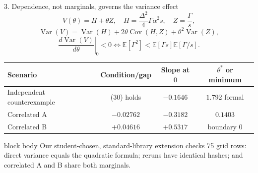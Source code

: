 \documentclass[aspectratio=169,11pt]{beamer}
\newcommand{\keybox}[1]{%
  \begin{beamercolorbox}[rounded=true,sep=0.8ex]{block body}
    #1
  \end{beamercolorbox}%
}
\begin{document}
\begin{frame}{3. Dependence, not marginals, governs the variance effect}
  \vspace{-0.25cm}
  \[
    V(\theta)=H+\theta Z,\quad
    H=\frac{\Delta^2}{4}\Gamma\alpha^2s,\quad Z=\frac{\Gamma}{s},
  \]
  \vspace{-0.25cm}
  \[
    \operatorname{Var}(V)=\operatorname{Var}(H)
    +2\theta\operatorname{Cov}(H,Z)+\theta^2\operatorname{Var}(Z),
  \]
  \vspace{-0.20cm}
  \[
    \left.\frac{d\operatorname{Var}(V)}{d\theta}\right|_0<0
    \iff
    \mathbb E[\Gamma^2]<\mathbb E[\Gamma s]\mathbb E[\Gamma/s].
  \]

  \vspace{-0.10cm}
  \begin{center}
  \small
  \begin{tabular}{lccc}
    \toprule
    Scenario & Condition/gap & Slope at \(0\) & \(\theta^*\) or minimum \\
    \midrule
    Independent counterexample & (30) holds & \(-0.1646\) & \(1.792\) formal \\
    Correlated A & \(-0.02762\) & \(-0.3182\) & \(0.1403\) \\
    Correlated B & \(+0.04616\) & \(+0.5317\) & boundary \(0\) \\
    \bottomrule
  \end{tabular}
  \end{center}

  \keybox{\small Our student-chosen, standard-library extension checks 75 grid rows:
  direct variance equals the quadratic formula; reruns have identical hashes; and
  correlated A and B share both marginals.}
\end{frame}
\end{document}
